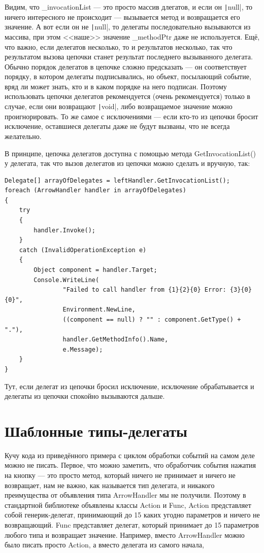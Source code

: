 \documentclass[a5paper]{article}
\begin{document}
Видим, что \_invocationList --- это просто массив длегатов, и если он \texttt|null|, то ничего интересного не происходит --- вызывается метод и возвращается его значение. А вот если он не \texttt|null|, то делегаты последовательно вызываются из массива, при этом <<наше>> значение \_methodPtr даже не используется. Ещё, что важно, если делегатов несколько, то и результатов несколько, так что результатом вызова цепочки станет результат последнего вызыванного делегата. Обычно порядок делегатов в цепочке сложно предсказать --- он соответствует порядку, в котором делегаты подписывались, но объект, посылающий событие, вряд ли может знать, кто и в каком порядке на него подписан. Поэтому использовать цепочки делегатов рекомендуется (очень рекомендуется) только в случае, если они возвращают \texttt|void|, либо возвращаемое значение можно проигнорировать. То же самое с исключениями --- если кто-то из цепочки бросит исключение, оставшиеся делегаты даже не будут вызваны, что не всегда желательно.

В принципе, цепочка делегатов доступна с помощью метода GetInvocationList() у делегата, так что вызов делегатов из цепочки можно сделать и вручную, так:

\begin{verbatim}
Delegate[] arrayOfDelegates = leftHandler.GetInvocationList();
foreach (ArrowHandler handler in arrayOfDelegates) 
{
    try 
    {
        handler.Invoke();
    }
    catch (InvalidOperationException e) 
    {
        Object component = handler.Target;
        Console.WriteLine(
                "Failed to call handler from {1}{2}{0} Error: {3}{0}{0}",
                Environment.NewLine,
                ((component == null) ? "" : component.GetType() + "."),
                handler.GetMethodInfo().Name,
                e.Message);
    }
}
\end{verbatim}

Тут, если делегат из цепочки бросил исключение, исключение обрабатывается и делегаты из цепочки спокойно вызываются дальше.

\section{Шаблонные типы-делегаты}

Кучу кода из приведённого примера с циклом обработки событий на самом деле можно не писать. Первое, что можно заметить, что обработчик события нажатия на кнопку --- это просто метод, который ничего не принимает и ничего не возвращает, нам не важно, как называется тип делегата, и никакого преимущества от объявления типа ArrowHandler мы не получили. Поэтому в стандартной библиотеке объявлены классы Action и Func, Action представляет собой генерик-делегат, принимающий до 15 каких угодно параметров и ничего не возвращающий. Func представляет делегат, который принимает до 15 параметров любого типа и возвращает значение. Например, вместо ArrowHandler можно было писать просто Action, а вместо делегата из самого начала, 
\end{document}
